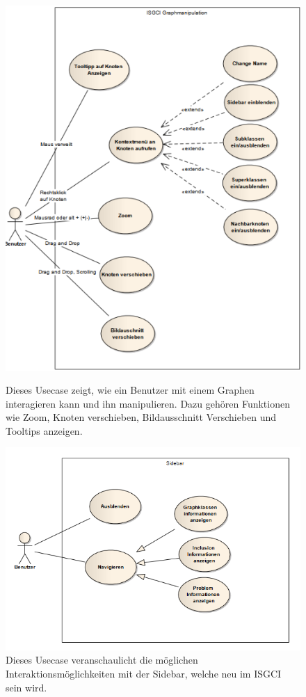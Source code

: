 \documentclass[10pt,a4paper]{article}
\begin{document}
\begin{figure}[htp]
	\begin{center}
		\includegraphics[width=13cm]{Graphmanipulation.PNG}\\
	\end{center}
	\caption{Dieses Usecase zeigt, wie ein Benutzer mit einem Graphen interagieren kann und ihn manipulieren. Dazu gehören Funktionen wie Zoom, Knoten verschieben, Bildausschnitt Verschieben und Tooltips anzeigen.}
	\label{fig:figure1}
\end{figure}

\newpage
\begin{figure}[htp]
	\begin{center}
		\includegraphics[width=13cm]{Sidebar.PNG}	
	\end{center}
	\caption{Dieses Usecase veranschaulicht die möglichen Interaktionsmöglichkeiten mit der Sidebar, welche neu im ISGCI sein wird.}
	\label{fig:figure1}
\end{figure}
\newpage
\end{document}
